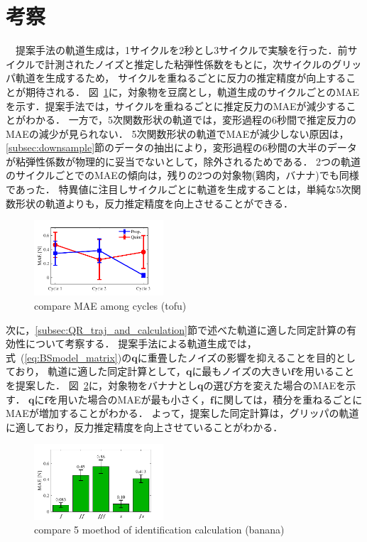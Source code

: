 \documentclass[a4paper]{jarticle}
\begin{document}
\section{考察}
　提案手法の軌道生成は，1サイクルを2秒とし3サイクルで実験を行った．前サイクルで計測されたノイズと推定した粘弾性係数をもとに，次サイクルのグリッパ軌道を生成するため，
サイクルを重ねるごとに反力の推定精度が向上することが期待される．
図~\ref{fig:compare_cycle_MAE}に，対象物を豆腐とし，軌道生成のサイクルごとのMAEを示す．提案手法では，サイクルを重ねるごとに推定反力のMAEが減少することがわかる．
一方で，5次関数形状の軌道では，変形過程の6秒間で推定反力のMAEの減少が見られない．
5次関数形状の軌道でMAEが減少しない原因は，\ref{subsec:downsample}節のデータの抽出により，変形過程の6秒間の大半のデータが粘弾性係数が物理的に妥当でないとして，除外されるためである．
2つの軌道のサイクルごとでのMAEの傾向は，残りの2つの対象物(鶏肉，バナナ)でも同様であった．
特異値に注目しサイクルごとに軌道を生成することは，単純な5次関数形状の軌道よりも，反力推定精度を向上させることができる．
\begin{figure}[htbp]
    \centering
    \includegraphics[width=0.43\textwidth]{compare_cycle_MAE.pdf}
    \caption{compare MAE among cycles (tofu)}
    \label{fig:compare_cycle_MAE}
\end{figure}

次に，\ref{subsec:QR_traj_and_calculation}節で述べた軌道に適した同定計算の有効性について考察する．
提案手法による軌道生成では，式~(\ref{eq:BSmodel_matrix})の$\mathbf{q}$に重畳したノイズの影響を抑えることを目的としており，
軌道に適した同定計算として，$\mathbf{q}$に最もノイズの大きい$\boldsymbol{f}$を用いることを提案した．
図~\ref{fig:compare_select5mode}に，対象物をバナナとし$\mathbf{q}$の選び方を変えた場合のMAEを示す．
$\mathbf{q}$に$\boldsymbol{f}$を用いた場合のMAEが最も小さく，$\boldsymbol{{f}}$に関しては，積分を重ねるごとにMAEが増加することがわかる．
よって，提案した同定計算は，グリッパの軌道に適しており，反力推定精度を向上させていることがわかる．
\begin{figure}[htbp]
    \centering
    \includegraphics[width=0.43\textwidth]{select_differet_q_banana.pdf}
    \captionsetup{width=0.9\linewidth} %
    \caption{compare 5 moethod of identification calculation (banana)}
    \label{fig:compare_select5mode}
\end{figure}
\end{document}
